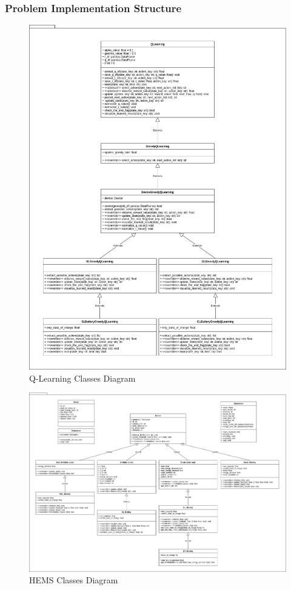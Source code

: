 \subsubsection{Problem Implementation Structure}
\begin{figure}[H]
    \centering
    \includegraphics[width=\textwidth]{RL immagini/Q-Learning Classes Diagram.png}
    \caption{Q-Learning Classes Diagram}
\end{figure}

\begin{figure}[H]
    \centering
    \includegraphics[angle=270, width=\textwidth]{RL immagini/HEMS Classes Diagram.png}
    \caption{HEMS Classes Diagram}
\end{figure}

